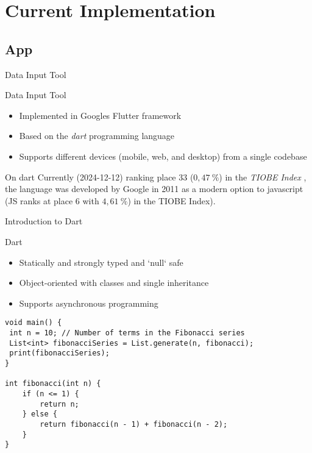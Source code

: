 \documentclass{beamer}
\begin{document}
\section{Current Implementation}
\subsection{App}%
\label{sub:App}

\begin{frame}{Data Input Tool}
    \begin{block}{Data Input Tool}
        \begin{itemize}
            \item Implemented in Googles Flutter framework
            \item Based on the \textit{dart} programming language
            \item Supports different devices (mobile, web, and desktop) from a single codebase
        \end{itemize}
    \end{block}
    \begin{block}{On dart}
        Currently (2024-12-12) ranking place 33 ($0,47~\%$) in the \textit{TIOBE Index} \cite{TIOBE}, the language was developed by Google in 2011 as a modern option to javascript (JS ranks at place 6 with $4,61~\%$) in the TIOBE Index).
    \end{block}
\end{frame}

\begin{frame}[fragile]{Introduction to Dart}
    \begin{block}{Dart}
        \begin{itemize}
            \item Statically and strongly typed and `null` safe
            \item Object-oriented with classes and single inheritance
            \item Supports asynchronous programming
        \end{itemize}
    \end{block}
    \begin{verbatim}
void main() {
 int n = 10; // Number of terms in the Fibonacci series
 List<int> fibonacciSeries = List.generate(n, fibonacci);
 print(fibonacciSeries);
}

int fibonacci(int n) {
    if (n <= 1) {
        return n;
    } else {
        return fibonacci(n - 1) + fibonacci(n - 2);
    }
}
\end{verbatim}
\end{frame}
\end{document}
